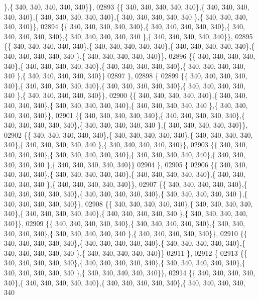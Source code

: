 \begin{DoxyCode}
      \},\{ 340, 340, 340, 340, 340\}\},
02893 \{\{ 340, 340, 340, 340, 340\},\{ 340, 340, 340, 340, 340\},\{ 340, 340, 340, 340, 340\},\{ 340, 340, 340, 340, 340
      \},\{ 340, 340, 340, 340, 340\}\},
02894 \{\{ 340, 340, 340, 340, 340\},\{ 340, 340, 340, 340, 340\},\{ 340, 340, 340, 340, 340\},\{ 340, 340, 340, 340, 340
      \},\{ 340, 340, 340, 340, 340\}\},
02895 \{\{ 340, 340, 340, 340, 340\},\{ 340, 340, 340, 340, 340\},\{ 340, 340, 340, 340, 340\},\{ 340, 340, 340, 340, 340
      \},\{ 340, 340, 340, 340, 340\}\},
02896 \{\{ 340, 340, 340, 340, 340\},\{ 340, 340, 340, 340, 340\},\{ 340, 340, 340, 340, 340\},\{ 340, 340, 340, 340, 340
      \},\{ 340, 340, 340, 340, 340\}\}
02897 \},
02898 \{
02899 \{\{ 340, 340, 340, 340, 340\},\{ 340, 340, 340, 340, 340\},\{ 340, 340, 340, 340, 340\},\{ 340, 340, 340, 340, 340
      \},\{ 340, 340, 340, 340, 340\}\},
02900 \{\{ 340, 340, 340, 340, 340\},\{ 340, 340, 340, 340, 340\},\{ 340, 340, 340, 340, 340\},\{ 340, 340, 340, 340, 340
      \},\{ 340, 340, 340, 340, 340\}\},
02901 \{\{ 340, 340, 340, 340, 340\},\{ 340, 340, 340, 340, 340\},\{ 340, 340, 340, 340, 340\},\{ 340, 340, 340, 340, 340
      \},\{ 340, 340, 340, 340, 340\}\},
02902 \{\{ 340, 340, 340, 340, 340\},\{ 340, 340, 340, 340, 340\},\{ 340, 340, 340, 340, 340\},\{ 340, 340, 340, 340, 340
      \},\{ 340, 340, 340, 340, 340\}\},
02903 \{\{ 340, 340, 340, 340, 340\},\{ 340, 340, 340, 340, 340\},\{ 340, 340, 340, 340, 340\},\{ 340, 340, 340, 340, 340
      \},\{ 340, 340, 340, 340, 340\}\}
02904 \},
02905 \{
02906 \{\{ 340, 340, 340, 340, 340\},\{ 340, 340, 340, 340, 340\},\{ 340, 340, 340, 340, 340\},\{ 340, 340, 340, 340, 340
      \},\{ 340, 340, 340, 340, 340\}\},
02907 \{\{ 340, 340, 340, 340, 340\},\{ 340, 340, 340, 340, 340\},\{ 340, 340, 340, 340, 340\},\{ 340, 340, 340, 340, 340
      \},\{ 340, 340, 340, 340, 340\}\},
02908 \{\{ 340, 340, 340, 340, 340\},\{ 340, 340, 340, 340, 340\},\{ 340, 340, 340, 340, 340\},\{ 340, 340, 340, 340, 340
      \},\{ 340, 340, 340, 340, 340\}\},
02909 \{\{ 340, 340, 340, 340, 340\},\{ 340, 340, 340, 340, 340\},\{ 340, 340, 340, 340, 340\},\{ 340, 340, 340, 340, 340
      \},\{ 340, 340, 340, 340, 340\}\},
02910 \{\{ 340, 340, 340, 340, 340\},\{ 340, 340, 340, 340, 340\},\{ 340, 340, 340, 340, 340\},\{ 340, 340, 340, 340, 340
      \},\{ 340, 340, 340, 340, 340\}\}
02911 \},
02912 \{
02913 \{\{ 340, 340, 340, 340, 340\},\{ 340, 340, 340, 340, 340\},\{ 340, 340, 340, 340, 340\},\{ 340, 340, 340, 340, 340
      \},\{ 340, 340, 340, 340, 340\}\},
02914 \{\{ 340, 340, 340, 340, 340\},\{ 340, 340, 340, 340, 340\},\{ 340, 340, 340, 340, 340\},\{ 340, 340, 340, 340, 340

\end{DoxyCode}
